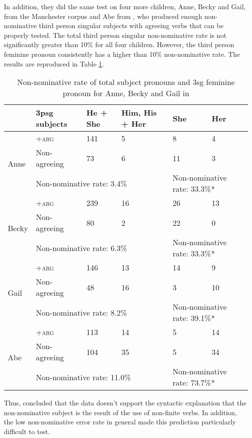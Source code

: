 In addition, they did the same test on four more children, Anne, Becky and Gail, from the Manchester corpus \citep{theakston2001} and Abe from  \cite{kuczaj1977acquisition}, who produced enough non-nominative third person singular subjects with agreeing verbs that can be properly tested. The total third person singular non-nominative rate is not significantly greater than 10\% for all four children. However, the third person feminine pronoun consistently has a higher than 10\% non-nominative rate. The results are reproduced in Table \ref{tab: Pine}. 
\FloatBarrier
\begin{table}[!h]
\centering
\caption{Non-nominative rate of total subject pronouns and 3sg feminine pronoun for Anne, Becky and Gail in \cite{pine2005testing}}
\label{tab: Pine}
\begin{tabular}{llll|ll}
\toprule
 & 3psg subjects & He + She & Him, His + Her & She & Her \\ \hline
\multirow{3}{*}{Anne} & \textsc{+arg} & 141 & 5 & 8 & 4 \\
 & Non-agreeing & 73 & 6 & 11 & 3 \\ \cline{2-6} 
 & \multicolumn{3}{l|}{Non-nominative rate: 3.4\%} & \multicolumn{2}{l}{Non-nominative rate: 33.3\%*} \\ \hline
\multirow{3}{*}{Becky} & \textsc{+arg} & 239 & 16 & 26 & 13 \\
 & Non-agreeing & 80 & 2 & 22 & 0 \\ \cline{2-6} 
 & \multicolumn{3}{l|}{Non-nominative rate: 6.3\%} & \multicolumn{2}{l}{Non-nominative rate: 33.3\%*} \\ \hline
\multirow{3}{*}{Gail} & \textsc{+arg} & 146 & 13 & 14 & 9 \\
 & Non-agreeing & 48 & 16 & 3 & 10 \\ \cline{2-6} 
 & \multicolumn{3}{l|}{Non-nominative rate: 8.2\%} & \multicolumn{2}{l}{Non-nominative rate: 39.1\%*}\\
 \hline
\multirow{3}{*}{Abe} & \textsc{+arg} &113  & 14 & 5 & 14 \\
 & Non-agreeing & 104 & 35 & 5 & 34 \\ \cline{2-6} 
 & \multicolumn{3}{l|}{Non-nominative rate: 11.0\%} & \multicolumn{2}{l}{Non-nominative rate: 73.7\%*}\\
 \bottomrule
\end{tabular}
\end{table}
\FloatBarrier
Thus, \cite{pine2005testing} concluded that the data doesn't support the syntactic explanation that the non-nominative subject is the result of the use of non-finite verbs. In addition, the low non-nominative error rate in general made this prediction particularly difficult to test. 

